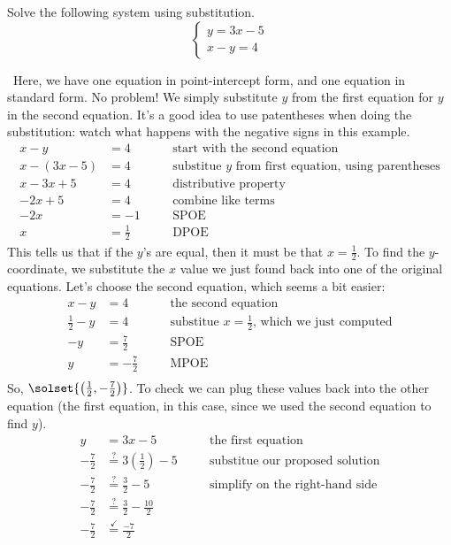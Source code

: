\begin{boxedex}
Solve the following system using substitution.
\[
\left\{%
\begin{array}{l}
y=3x-5\\
x-y=4
\end{array}
\right.
\] 

\exsoln\ Here, we have one equation in point-intercept form, and one equation in standard form. No problem! We simply substitute $y$ from the first equation for $y$ in the second equation. It's a good idea to use patentheses when doing the substitution: watch what happens with the negative signs in this example.
\[\begin{aligned}
x-y &= 4
&& \quad\text{start with the second equation}\\
x-(3x-5) &= 4
&& \quad\text{substitue $y$ from first equation, using parentheses}\\
x - 3x + 5 &= 4
&& \quad\text{distributive property}\\
-2x + 5 &= 4
&& \quad\text{combine like terms}\\
-2x &= -1
&& \quad\text{SPOE}\\[1ex]
x &= \frac{1}{2}
&& \quad\text{DPOE}
\end{aligned}\]
This tells us that if the $y$'s are equal, then it must be that $x=\frac{1}{2}$. To find the $y$-coordinate, we substitute the $x$ value we just found back into one of the original equations. Let's choose the second equation, which seems a bit easier:
\[\begin{aligned}
x-y &= 4
&& \quad\text{the second equation}\\[1ex]
\frac{1}{2}-y &= 4
&& \quad\text{substitue $x = \tfrac{1}{2}$, which we just computed}\\[1ex]
-y &= \frac{7}{2}
&& \quad\text{SPOE}\\
y &= -\frac{7}{2}
&& \quad\text{MPOE}\\
\end{aligned}\]
So, $\solset{\left(\frac{1}{2}, -\frac{7}{2}\right)}$. To check we can plug these values back into the other equation (the first equation, in this case, since we used the second equation to find $y$).
\[\begin{aligned}
y &= 3x-5
&& \quad\text{the first equation}\\[1ex]
-\frac{7}{2} &\overset{?}{=} 3\left(\frac{1}{2}\right)-5
&& \quad\text{substitue our proposed solution}\\[1ex]
-\frac{7}{2} &\overset{?}{=} \frac{3}{2}-5
&& \quad\text{simplify on the right-hand side}\\[1ex]
-\frac{7}{2} &\overset{?}{=} \frac{3}{2}-\frac{10}{2}
&& \quad\text{}\\[1ex]
-\frac{7}{2} &\overset{\checkmark}{=} \frac{-7}{2}
&& \quad\text{}
\end{aligned}\]
\end{boxedex}

